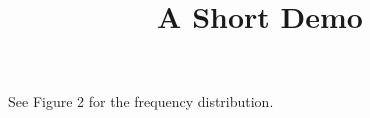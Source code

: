 \documentclass[article]{jss}
\title{A Short Demo}
\begin{document}
See Figure 2 for the frequency distribution.
\end{document}
